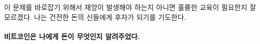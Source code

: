 \begin{comment}
	If it will take a series of catastrophes or simply a monumental
	educational effort to correct this corruption remains to be seen. I pray
	to the gods of sound money that it will be the latter.
\end{comment}
이 문제를 바로잡기 위해서 재앙이 발생해야 하는지 아니면 훌륭한 교육이 필요한지 잘 모르겠다. 
나는 건전한 돈의 신들에게 후자가 되기를 기도한다. 

\paragraph{비트코인은 나에게 돈이 무엇인지 알려주었다.}

%
%
%
%
